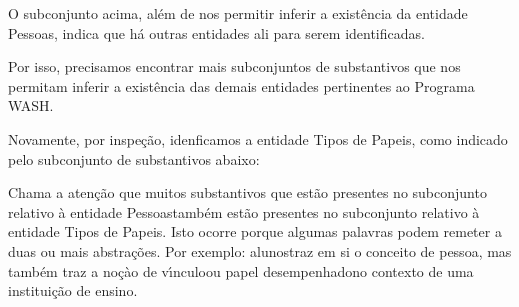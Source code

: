 \documentclass[
12pt,		%
openright,	%
twoside,  %
a4paper,			%
chapter=TITLE,		%
english,			%
french,				%
spanish,			%
brazil				%
]{USPSC-classe/USPSC}
\begin{document}
\noindent\begin{center}\mbox{\centering{}}\end{center}


O subconjunto acima, al\'em de nos permitir inferir a exist\^encia da entidade \textquotedbl Pessoas\textquotedbl , indica que h\'a outras entidades ali para serem identificadas.




Por isso, precisamos encontrar mais subconjuntos de substantivos que nos permitam inferir a exist\^encia  das demais entidades pertinentes ao Programa WASH.




Novamente, por inspe\c{c}\~ao, idenficamos a entidade \textquotedbl Tipos de Papeis\textquotedbl , como indicado pelo subconjunto de substantivos abaixo:





\noindent\begin{center}\mbox{\centering{}}\end{center}


Chama a aten\c{c}\~ao que muitos substantivos que est\~ao presentes no subconjunto relativo \`a entidade \textquotedbl Pessoas\textquotedbl  tamb\'em est\~ao presentes no subconjunto relativo \`a entidade \textquotedbl Tipos de Papeis\textquotedbl . Isto ocorre porque algumas palavras podem remeter a duas ou mais abstra\c{c}\~oes. Por exemplo: \textquotedbl alunos\textquotedbl  traz em si o conceito de \textquotedbl pessoa\textquotedbl , mas tamb\'em traz a no\c{c}\`ao de \textquotedbl v\'{\i}nculo\textquotedbl  ou \textquotedbl papel desempenhado\textquotedbl  no contexto de uma institui\c{c}\~ao de ensino.
\end{document}
